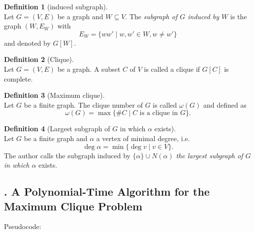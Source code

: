 \documentclass[12pt, xcolor=dvipsnames]{scrartcl}
\theoremstyle{definition}
\newtheorem{definition}{Definition}%
\newcommand{\card}[1]{\# #1}
\theoremstyle{definition}
\begin{document}
\begin{definition}[induced subgraph]\ \\
	Let $G = (V,E)$ be a graph and $W\subseteq V$. 
	The \emph{subgraph of $G$ induced by $W$} is
	the graph $(W,E_W)$ with
	\begin{equation*}
		E_W = \{ww'\mid w, w'\in W, w\neq w'\}
	\end{equation*}
	and denoted by $G[W]$.
\end{definition}

\begin{definition}[Clique]\ \\
    Let $G = (V,E)$ be a graph. 
    A subset $C$ of $V$ is called a clique if $G[C]$ is complete.
\end{definition}

\begin{definition}[Maximum clique]\ \\
    Let $G$ be a finite graph.
    The clique number of $G$ is called $\omega(G)$ and defined as
    \[ \omega(G) = \max\{\card C \mid C \text{ is a clique in }G\}. \]
\end{definition}

\begin{definition}[Largest subgraph of $G$ in which $\alpha$ exists]\ \\
	Let $G$ be a finite graph and $\alpha$ a vertex of minimal degree, i.e.
    \[ \deg \alpha = \min\{\deg v \mid v \in V\}. \]
    The author calls the subgraph induced by $\{\alpha\}\cup N(\alpha)$
    \emph{the largest subgraph of $G$ in which $\alpha$} exists.
\end{definition}

\subsection*{. A Polynomial-Time Algorithm for the Maximum Clique Problem}

Pseudocode:

\end{document}
